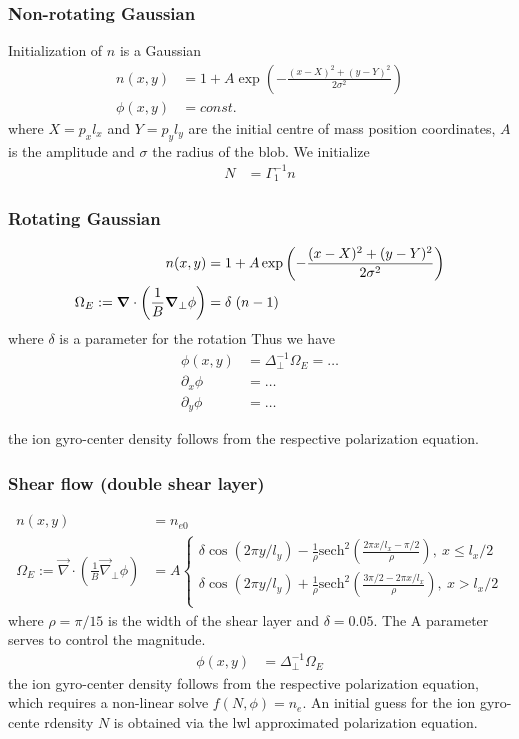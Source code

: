 \subsubsection{Non-rotating Gaussian}
Initialization of $n$ is a Gaussian 
\begin{align}
    n(x,y) &= 1 + A\exp\left( -\frac{(x-X)^2 + (y-Y)^2}{2\sigma^2}\right) \\
    \phi(x,y)&=const.
\end{align}
where $X = p_x l_x$ and $Y=p_yl_y$ are the initial centre of mass position coordinates, $A$ is the amplitude and $\sigma$ the
radius of the blob.
We initialize 
\begin{align}
    N &= \Gamma_1^{-1} n 
\end{align}
\subsubsection{Rotating Gaussian}
\begin{align}
    n(x,y) &= 1 + A\exp\left( -\frac{(x-X)^2 + (y-Y)^2}{2\sigma^2}\right) \\
    \Omega_E:= \vec{\nabla} \cdot \left(\frac{1}{B} \vec{\nabla}_\perp \phi\right) &= \delta \hspace{1mm} (n-1)
\end{align}
where \(\delta\) is a parameter for the rotation
Thus we have
\begin{align}
  \phi(x,y) &= \Delta_\perp^{-1} \Omega_E = \dots \\
  \partial_x \phi &= \dots \\
   \partial_y \phi &= \dots
\end{align}

the ion gyro-center density follows from the respective polarization equation.

\subsubsection{Shear flow (double shear layer)}
\begin{align}
 n(x,y) &= n_{e0}\\
    \Omega_E:= \vec{\nabla} \cdot \left(\frac{1}{B} \vec{\nabla}_\perp \phi\right) &= A
    \begin{cases}
        \delta \cos(2 \pi y/l_y) - \frac{1}{\rho} \text{sech}^2 \left(\frac{2 \pi x/l_x-\pi/2}{\rho}\right),\ x \leq l_x/2 \\
        \delta \cos(2 \pi y/l_y) + \frac{1}{\rho} \text{sech}^2 \left(\frac{3 \pi /2-2 \pi x/l_x}{\rho}\right),\ x > l_x/2 \\
    \end{cases}
\end{align}
where \(\rho=\pi/15\) is the width of the shear layer and \(\delta=0.05\). The A parameter serves to control the magnitude.
\begin{align}
  \phi(x,y) &= \Delta_\perp^{-1} \Omega_E
\end{align}
the ion gyro-center density follows from the respective polarization equation, which requires a non-linear solve \(f(N,\phi) = n_e\). An initial guess for the ion gyro-cente rdensity \(N\) is obtained via the lwl approximated polarization equation.

